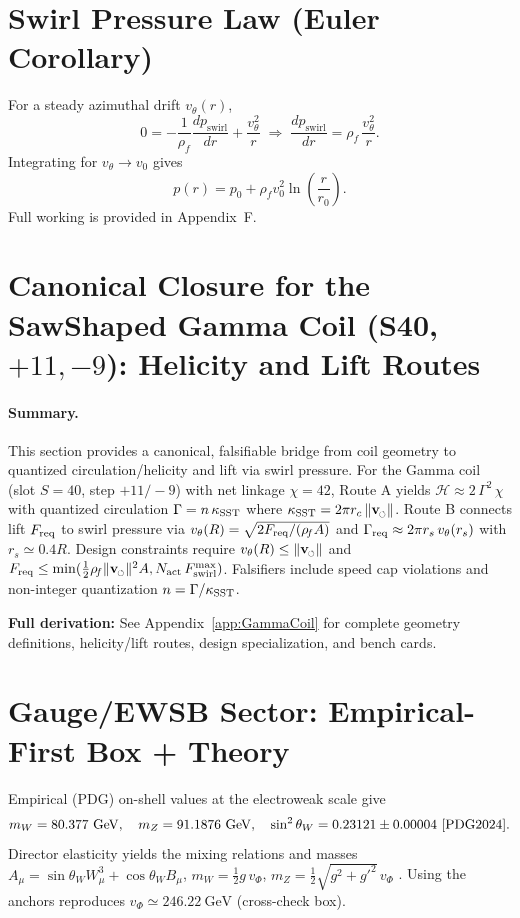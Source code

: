 \documentclass[10pt,reprint,aps,onecolumn,nofootinbib]{revtex4-2}
\newcommand{\vnorm}{\lVert \mathbf{v}_{\mkern-2mu\scriptscriptstyle\boldsymbol{\circlearrowleft}} \rVert}               %
\newcommand{\rhof}{\rho_{\!f}}                           %
\newcommand{\rhoF}{\rho_{\!f}}
\newcommand{\rc}{r_c}                                    %
\begin{document}
\section{Swirl Pressure Law (Euler Corollary)}\label{canon58:pressure}
For a steady azimuthal drift $v_\theta(r)$,
\[
    0=-\frac{1}{\rhof}\frac{dp_{\text{swirl}}}{dr}+\frac{v_\theta^2}{r}
    \;\Rightarrow\;
    \frac{dp_{\text{swirl}}}{dr}=\rhof\,\frac{v_\theta^2}{r}.
\]
Integrating for $v_\theta\to v_0$ gives
\[
    p(r)=p_0+\rhof v_0^2\ln\!\left(\frac{r}{r_0}\right).
\]
Full working is provided in Appendix~F.



\section{Canonical Closure for the SawShaped Gamma Coil (S40, $+11,-9$): Helicity and Lift Routes}
\label{sec:GammaCoilClosure}

\paragraph{Summary.}
    This section provides a canonical, falsifiable bridge from coil geometry to quantized circulation/helicity and lift via swirl pressure. For the Gamma coil (slot $S=40$, step $+11/-9$) with net linkage $\chi=42$, Route A yields $\mathcal{H} \approx 2\,\Gamma^{2}\,\chi$ with quantized circulation $\Gamma = n\,\kappa_{\rm SST}$ where $\kappa_{\rm SST} = 2\pi \rc\,\vnorm$. Route B connects lift $F_{\rm req}$ to swirl pressure via $v_\theta(R)=\sqrt{2F_{\rm req}/(\rhoF A)}$ and $\Gamma_{\rm req}\approx 2\pi r_s\,v_\theta(r_s)$ with $r_s\simeq 0.4R$. Design constraints require $v_\theta(R)\le \vnorm$ and $F_{\rm req}\le \min(\tfrac{1}{2}\rhoF \vnorm^{2} A, N_{\rm act}\,F_{\text{swirl}}^{\max})$. Falsifiers include speed cap violations and non-integer quantization $n=\Gamma/\kappa_{\rm SST}$.

    \textbf{Full derivation:} See Appendix~\ref{app:GammaCoil} for complete geometry definitions, helicity/lift routes, design specialization, and bench cards.


\section{Gauge/EWSB Sector: Empirical-First Box + Theory}\label{canon58:gauge-openers}
Empirical (PDG) on-shell values at the electroweak scale give
\[
    m_W=80.377~\mathrm{GeV},\quad m_Z=91.1876~\mathrm{GeV},\quad \sin^2\theta_W=0.23121\pm0.00004 \ \cite{PDG2024}.
\]
Director elasticity yields the mixing relations and masses
$A_\mu=\sin\theta_W W^3_\mu+\cos\theta_W B_\mu$,
$m_W=\tfrac12 g\,v_\Phi$, $m_Z=\tfrac12\sqrt{g^2+g'^2}\,v_\Phi$ \cite{Weinberg1967,PeskinSchroeder1995}.
Using the anchors reproduces $v_\Phi\simeq 246.22~\mathrm{GeV}$ (cross-check box). %
\end{document}
